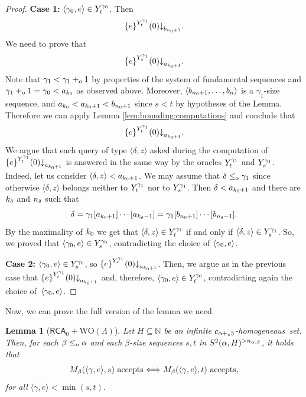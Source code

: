 \documentclass[11pt]{amsart}
\newtheorem{lemma}[thm]{Lemma}
\theoremstyle{definition}
\theoremstyle{remark}
\theoremstyle{plain}
\def\la{\langle}
\def\ra{\rangle}
\newcommand{\numberset}{\mathbb}
\newcommand{\N}{\numberset{N}}
\def\a{\alpha}
\def\b{\beta}
\newcommand{\RCA}{\mathsf{RCA}_0}
\newcommand{\set}[1]{{\{{#1}\}}}
\def\stops{{\downarrow}}
\def\WO{{\textrm{WO}}}
\newcommand{\leqo}{\leq\sb{o}}
\newcommand{\pluso}{+\sb{o}}
\def\N{{\mathbb{N}}}
\def\stops{{\downarrow}}
\newcommand{\homo}{homogeneous}
\def\ifff{\Longleftrightarrow}
\begin{document}
\begin{proof}
\textbf{Case 1:} $\langle\gamma\sb0,e\rangle\in Y\sp{\gamma\sb0}\sb{t}$. 
Then
$$
\set{e}\sp{Y\sp{\gamma\sb 1}\sb{t}}(0)\stops\sb{b\sb{n\sb0+1}}.
$$
We need to prove that 
$$
\set{e}\sp{Y\sp{\gamma\sb 1}\sb{s}}(0)\stops\sb{a\sb{k\sb0+1}}.
$$
Note that $\gamma\sb 1 < \gamma\sb 1\pluso 1$ by properties of the system of fundamental sequences and $\gamma\sb 1\pluso 1 = \gamma_0 <a\sb{k\sb0}$ as observed above. Moreover, $\langle b\sb{n\sb0+1},\dots, b\sb n\rangle$ is a $\gamma_1$-size sequence, and $a\sb{k\sb0} < a\sb{k\sb0+1} < b\sb{n\sb0+1}$ since $s<t$ by hypotheses of the Lemma. 
Therefore we can apply Lemma \ref{lem:bounding:computations} and conclude that
$$
\set{e}\sp {Y\sp{\gamma\sb 1}\sb{t}}(0)\stops\sb{a\sb{k\sb0+1}}.
$$
We argue that each query of type $\langle\delta,z\rangle$ asked during the computation of $\set{e}\sp {Y\sp{\gamma\sb 1}\sb{t}}(0)\stops\sb{a\sb{k\sb0+1}}$ is answered in the same way by the oracles $Y\sp{\gamma\sb 1}\sb{t}$ and $Y\sp{\gamma\sb 1}\sb{s}$. 
Indeed, let us consider $\langle\delta, z\rangle<a\sb{k\sb0+1}$. 
We may assume that $\delta\leqo\gamma\sb 1$ since otherwise $\langle\delta,z\rangle$ belongs neither to $Y\sp{\gamma\sb 1}\sb{t}$ nor to $Y\sp{\gamma\sb 1}\sb{s}$. 
Then $\delta<a\sb{k\sb0+1}$ and there are $k\sb\delta$ and $n\sb\delta$ such that 
$$
\delta=\gamma\sb 1[a\sb{k\sb0+1}]\cdots [a\sb{k\sb\delta-1}]=
\gamma\sb 1[b\sb{n\sb0+1}]\cdots [b\sb{n\sb\delta-1}].
$$
By the maximality of $k\sb0$ we get that $\langle\delta,z\rangle\in Y\sp{\gamma\sb 1}\sb{t}$ if and only if $\langle\delta, z\rangle\in Y\sp{\gamma\sb 1}\sb{s}$.
So, we proved that $\la \gamma\sb0,e\ra\in Y\sp{\gamma\sb0}\sb{s}$, contradicting the choice of $\langle\gamma\sb0,e\rangle$.
\smallskip

\textbf{Case 2:} $\langle\gamma\sb0,e\rangle\in Y\sp{\gamma\sb0}\sb{s}$, so
$\set{e}\sp {Y\sp{\gamma\sb 1}\sb{s}}(0)\stops\sb{a\sb{k\sb0+1}}$.
Then, we argue as in the previous case that 
$\set{e}\sp{ Y\sp{\gamma\sb 1}\sb{t}}(0)\stops\sb{a\sb{k\sb0+1}}$ and, therefore, $\la\gamma\sb0,e\ra \in Y\sp{\gamma\sb0}\sb{t}$, contradicting again the choice of~$\langle\gamma\sb 0,e\rangle$.
\end{proof}

Now, we can prove the full version of the lemma we need.

\begin{lemma}[$\RCA+\WO(\Lambda)$]\label{lem:eq:homo:wit}
Let $H\subseteq\N$ be an infinite $c\sb{\alpha \pluso3}$-\homo\ set. 
Then, for each $\beta \leqo \alpha$ and each $\beta$-size sequences $s, t$ in $S\sp2(\alpha,H)\sp{>n_{\a,\b}}$, it holds that
$$
{M\sb\beta(\langle\gamma,e\rangle,s)\mbox{ accepts}} \ifff
{M\sb\beta(\langle\gamma,e\rangle,t)\mbox{ accepts}},
$$
for all $\langle\gamma,e\rangle<\min(s,t)$.
\end{lemma}
\end{document}
